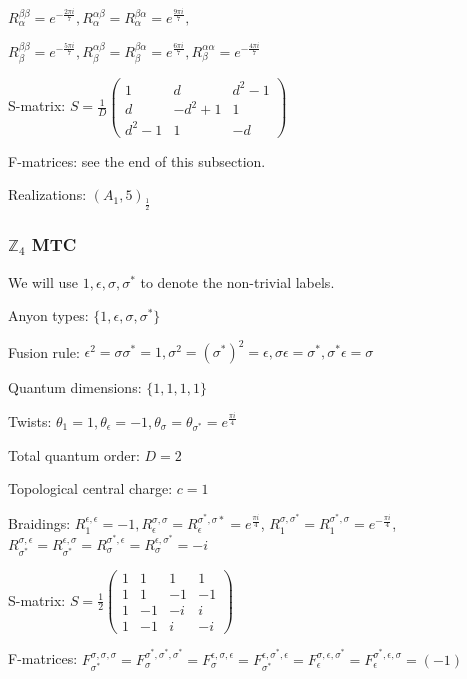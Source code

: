 \documentclass[12pt,psamsfonts]{amsart}
\newcommand{\e}{{\epsilon}}
\newcommand{\Z}{\mathbb Z}
\numberwithin{equation}{section}
\theoremstyle{definition}
\begin{document}
$R_{\alpha}^{\beta\beta}=e^{-\frac{2\pi i}{7}},
R_{\alpha}^{\alpha\beta}=R_{\alpha}^{\beta\alpha}=e^{\frac{9\pi
i}{7}},$

$R_{\beta}^{\beta\beta}=e^{-\frac{5\pi
i}{7}},R_{\beta}^{\alpha\beta}=R_{\beta}^{\beta\alpha}=e^{\frac{6\pi
i}{7}}, R_{\beta}^{\alpha\alpha}=e^{-\frac{4\pi i}{7}}$

S-matrix: $S=\frac{1}{D}\begin{pmatrix} 1 &d& d^2-1
\\ d & -d^2+1&1\\d^2-1&1&-d\end{pmatrix}$

F-matrices: see the end of this subsection.

Realizations: $(A_1,5)_{\frac{1}{2}}$

\subsubsection{$\Z_4$ MTC}

We will use $1,\e,\sigma,\sigma^*$ to denote the non-trivial labels.

Anyon types: $\{1,\e,\sigma,\sigma^*\}$

Fusion rule: $\e^2=\sigma\sigma^*=1, \sigma^2=(\sigma^*)^2=\e,\sigma\e=\sigma^*,\sigma^*\e=\sigma$

Quantum dimensions: $\{1,1,1,1\}$

Twists: $\theta_1=1,
\theta_{\e}=-1,\theta_{\sigma}=\theta_{\sigma^*}=e^{\frac{\pi
i}{4}}$

Total quantum order: $D=2$

Topological central charge: $c=1$

Braidings: $R^{\e,\e}_1=-1,
R^{\sigma,\sigma}_{\e}=R^{\sigma^*,\sigma*}_{\e}=e^{\frac{\pi
i}{4}}$,
$R^{\sigma,\sigma^*}_{1}=R^{\sigma^*,\sigma}_{1}=e^{-\frac{\pi
i}{4}}$,
$R^{\sigma,\e}_{\sigma^*}=R^{\e,\sigma}_{\sigma^*}=R^{\sigma^*,\e}_{\sigma}=R^{\e,\sigma^*}_{\sigma}=-i$

S-matrix:  $S=\frac{1}{2}\begin{pmatrix}
   1& 1& 1 & 1 \\
   1 & 1& -1 &-1\\
   1 & -1&-i &i\\
   1&-1&i& -i
 \end{pmatrix}$

F-matrices:
$F^{\sigma,\sigma,\sigma}_{\sigma^*}=F^{\sigma^*,\sigma^*,\sigma^*}_{\sigma}=F^{\e,\sigma,\e}_{\sigma}
=F^{\e,\sigma^*,\e}_{\sigma^*}=F^{\sigma,\e,\sigma^*}_{\e}=F^{\sigma^*,\e,\sigma}_{\e}=(-1)$
\end{document}
